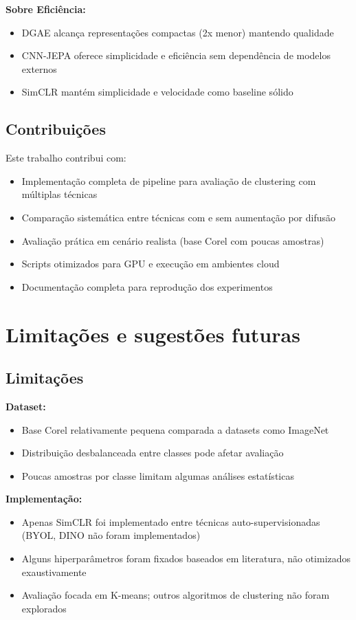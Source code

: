 \textbf{Sobre Eficiência:}
\begin{itemize}
    \item DGAE alcança representações compactas (2x menor) mantendo qualidade
    \item CNN-JEPA oferece simplicidade e eficiência sem dependência de modelos externos
    \item SimCLR mantém simplicidade e velocidade como baseline sólido
\end{itemize}

\subsection{Contribuições}

Este trabalho contribui com:

\begin{itemize}
    \item Implementação completa de pipeline para avaliação de clustering com múltiplas técnicas
    \item Comparação sistemática entre técnicas com e sem aumentação por difusão
    \item Avaliação prática em cenário realista (base Corel com poucas amostras)
    \item Scripts otimizados para GPU e execução em ambientes cloud
    \item Documentação completa para reprodução dos experimentos
\end{itemize}

\section{Limitações e sugestões futuras}

\subsection{Limitações}

\textbf{Dataset:}
\begin{itemize}
    \item Base Corel relativamente pequena comparada a datasets como ImageNet
    \item Distribuição desbalanceada entre classes pode afetar avaliação
    \item Poucas amostras por classe limitam algumas análises estatísticas
\end{itemize}

\textbf{Implementação:}
\begin{itemize}
    \item Apenas SimCLR foi implementado entre técnicas auto-supervisionadas (BYOL, DINO não foram implementados)
    \item Alguns hiperparâmetros foram fixados baseados em literatura, não otimizados exaustivamente
    \item Avaliação focada em K-means; outros algoritmos de clustering não foram explorados
\end{itemize}

